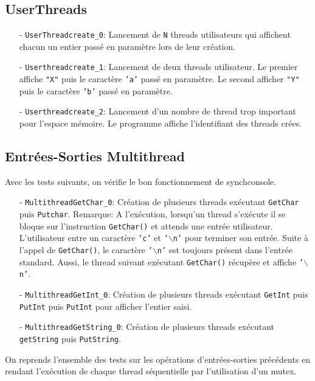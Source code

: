 \documentclass[11pt]{article}
\theoremstyle{definition}
\theoremstyle{definition}
\begin{document}
\subsection{UserThreads}
\begin{itemize}
\item[-] \texttt{UserThreadcreate\_0}: Lancement de \texttt{N} threads utilisateurs qui affichent chacun un entier passé en paramètre lors de leur
  création.
\item[-] \texttt{Userthreadcreate\_1}: Lancement de deux threads utilisateur. Le premier affiche \texttt{"X"} puis le caractère \texttt{'a'} passé en paramètre.
  Le second afficher \texttt{"Y"} puis le caractère \texttt{'b'} passé en paramètre.
\item[-] \texttt{Userthreadcreate\_2}: Lancement d'un nombre de thread trop important pour l'espace mémoire.
  Le programme affiche l'identifiant des threads crées.
\end{itemize}

\subsection{Entrées-Sorties Multithread}
 Avec les tests suivants, on vérifie le bon fonctionnement de synchconsole.
\begin{itemize}
\item[-] \texttt{MultithreadGetChar\_0}: Création de plusieurs threads exécutant \texttt{GetChar}
  puis \texttt{Putchar}.
  Remarque:
  A l'exécution, lorsqu'un thread s'exécute il se bloque sur l'instruction \texttt{GetChar()} et attends une
  entrée utilisateur. L'utilisateur entre un caractère \texttt{'c'} et \texttt{'$\backslash$n'} pour terminer son entrée.
  Suite à l'appel de \texttt{GetChar()}, le caractère \texttt{'$\backslash$n'} est toujours
  présent dans l'entrée standard. Aussi, le thread suivant exécutant \texttt{GetChar()} récupère et
  affiche \texttt{'$\backslash$n'}.
\item[-] \texttt{MultithreadGetInt\_0}: Création de plusieurs threads exécutant \texttt{GetInt} puis  \texttt{PutInt}
  puis \texttt{PutInt} pour afficher l'entier saisi.
\item[-] \texttt{MultithreadGetString\_0}: Création de plusieurs threads exécutant
  \texttt{getString} puis \texttt{PutString}.
\end{itemize}

On reprends l'ensemble des tests sur les opérations d'entrées-sorties précédents en rendant l'exécution de chaque thread séquentielle par l'utilisation d'un mutex.
\end{document}
